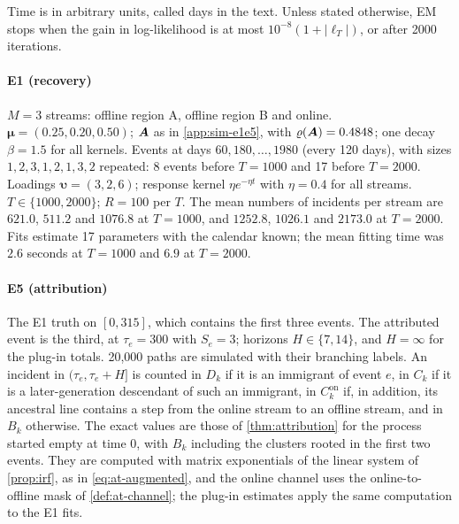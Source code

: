 Time is in arbitrary units, called days in the text. Unless stated otherwise, EM stops when
the gain in log-likelihood is at most $10^{-8}(1+|\ell_T|)$, or after 2000 iterations.

\paragraph{E1 (recovery)} $M=3$ streams: offline region A, offline region B and online.
$\bm\mu=(0.25,0.20,0.50)$; $\bm{A}$ as in \cref{app:sim-e1e5}, with
$\varrho(\bm{A})=0.4848$; one decay $\beta=1.5$ for all kernels. Events at days
$60,180,\dots,1980$ (every 120 days), with sizes $1,2,3,1,2,1,3,2$ repeated: 8 events before
$T=1000$ and 17 before $T=2000$. Loadings $\bm\upsilon=(3,2,6)$; response kernel
$\eta e^{-\eta t}$ with $\eta=0.4$ for all streams. $T\in\{1000,2000\}$; $R=100$ per $T$.
The mean numbers of incidents per stream are $621.0$, $511.2$ and $1076.8$ at $T=1000$,
and $1252.8$, $1026.1$ and $2173.0$ at $T=2000$. Fits estimate 17 parameters with the
calendar known; the mean fitting time was $2.6$ seconds at $T=1000$ and $6.9$ at
$T=2000$.

\paragraph{E5 (attribution)} The E1 truth on $[0,315]$, which contains the first three
events. The attributed event is the third, at $\tau_e=300$ with $S_e=3$; horizons
$H\in\{7,14\}$, and $H=\infty$ for the plug-in totals. 20{,}000 paths are simulated with
their branching labels. An incident in $(\tau_e,\tau_e+H]$ is counted in $D_k$ if it is an
immigrant of event $e$, in $C_k$ if it is a later-generation descendant of such an
immigrant, in $C^{\mathrm{on}}_k$ if, in addition, its ancestral line contains a step from
the online stream to an offline stream, and in $B_k$ otherwise. The exact values are those
of \cref{thm:attribution} for the process started empty at time $0$, with $B_k$ including
the clusters rooted in the first two events. They are computed with matrix exponentials of
the linear system of \cref{prop:irf}, as in \eqref{eq:at-augmented}, and the online channel
uses the online-to-offline mask of \cref{def:at-channel}; the plug-in estimates apply the
same computation to the E1 fits.


